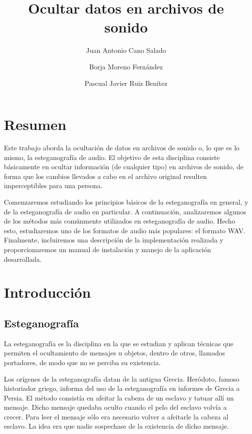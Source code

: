 \documentclass[12pt]{article}
\title{Ocultar datos en archivos de sonido}
\author{Juan Antonio Cano Salado \and Borja Moreno Fernández \and Pascual Javier Ruiz Benítez}
\begin{document}
\maketitle

\newpage
\tableofcontents

\newpage
\section{Resumen}

Este trabajo aborda la ocultación de datos en archivos de sonido o, lo que es lo mismo, la esteganografía de audio. El objetivo de esta disciplina consiste básicamente en ocultar información (de cualquier tipo) en archivos de sonido, de forma que los cambios llevados a cabo en el archivo original resulten imperceptibles para una persona.

Comenzaremos estudiando los principios básicos de la esteganografía en general, y de la esteganografía de audio en particular. A continuación, analizaremos algunos de los métodos más comúnmente utilizados en esteganografía de audio. Hecho esto, estudiaremos uno de los formatos de audio más populares: el formato WAV. Finalmente, incluiremos una descripción de la implementación realizada y proporcionaremos un manual de instalación y manejo de la aplicación desarrollada.

\section{Introducción}

\subsection{Esteganografía}

La esteganografía es la disciplina en la que se estudian y aplican técnicas que permiten el ocultamiento de mensajes u objetos, dentro de otros, llamados portadores, de modo que no se perciba su existencia.

Los orígenes de la esteganografía datan de la antigua Grecia. Heródoto, famoso historiador griego, informa del uso de la esteganografía en informes de Grecia a Persia. El método consistía en afeitar la cabeza de un esclavo y tatuar allí un mensaje. Dicho mensaje quedaba oculto cuando el pelo del esclavo volvía a crecer. Para leer el mensaje sólo era necesario volver a afeitarle la cabeza al esclavo. La idea era que nadie sospechase de la existencia de dicho mensaje.
\end{document}
